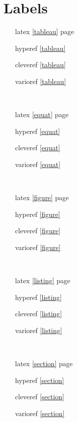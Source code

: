 \section{Labels}
\begin{itemize}
    \item[latex] \ref{tableau} page \pageref{tableau}
    \item[hyperef]  \autoref{tableau} 
    \item[cleveref] \cref{tableau} 
    \item[varioref] \vref{tableau}
\end{itemize}

~~

\begin{itemize}
    \item[latex] \ref{equat} page \pageref{equat}
    \item[hyperef]  \autoref{equat} 
    \item[cleveref] \cref{equat} 
    \item[varioref] \vref{equat}
\end{itemize}

~~

\begin{itemize}
    \item[latex] \ref{figure} page \pageref{figure}
    \item[hyperef]  \autoref{figure} 
    \item[cleveref] \cref{figure} 
    \item[varioref] \vref{figure}
\end{itemize}

~~

\begin{itemize}
    \item[latex] \ref{listing} page \pageref{listing}
    \item[hyperef]  \autoref{listing} 
    \item[cleveref] \cref{listing} 
    \item[varioref] \vref{listing}
\end{itemize}

~~

\begin{itemize}
    \item[latex] \ref{section} page \pageref{section}
    \item[hyperef]  \autoref{section} 
    \item[cleveref] \cref{section} 
    \item[varioref] \vref{section}
\end{itemize}

